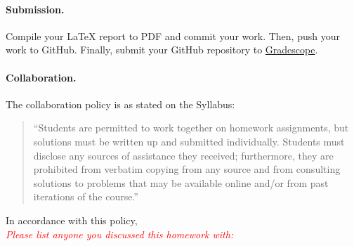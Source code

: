 \documentclass[11pt,letterpaper,english,oneside]{article} %
\theoremstyle{definition} %
\begin{document}
\paragraph{Submission.} Compile your LaTeX report to PDF and commit your work. Then, push your work to GitHub. Finally, submit your GitHub repository to \href{https://www.gradescope.com/courses/423692}{Gradescope}.

\paragraph{Collaboration.} The collaboration policy is as stated on the Syllabus:

\begin{quote}
``Students are permitted to work together on homework assignments, but solutions must be written up and submitted individually. Students must disclose any sources of assistance they received; furthermore, they are prohibited from verbatim copying from any source and from consulting solutions to problems that may be available online and/or from past iterations of the course.''
\end{quote}

\noindent In accordance with this policy, \\

\noindent \textcolor{red}{\textit{Please list anyone you discussed this homework with:}} 

\clearpage
\end{document}
